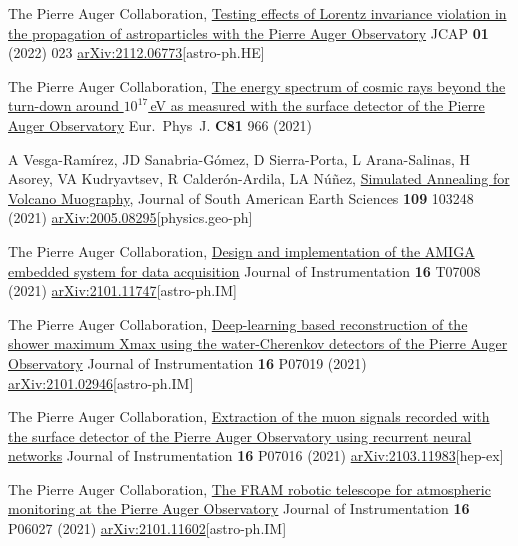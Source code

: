 \begin{etaremune}
\item {}The Pierre Auger Collaboration, \href{https://doi.org/10.1088/1475-7516/2022/01/023}{Testing effects of Lorentz invariance violation in the propagation of astroparticles with the Pierre Auger Observatory} JCAP {\textbf{01}} (2022) 023 \href{https://arxiv.org/abs/2112.06773}{arXiv:2112.06773}[astro-ph.HE]


\item {}The Pierre Auger Collaboration, \href{https://doi.org/10.1140/epjc/s10052-021-09700-w}{The energy spectrum of cosmic rays beyond the turn-down around $10^{17}$\,eV as measured with the surface detector of the Pierre Auger Observatory} Eur.\ Phys\  J. {\textbf{C81}} 966 (2021)

\item {} A Vesga-Ramírez, JD Sanabria-Gómez, D Sierra-Porta, L Arana-Salinas, H Asorey, VA Kudryavtsev, R Calderón-Ardila, LA Núñez, \href{https://doi.org/10.1016/j.jsames.2021.103248}{Simulated Annealing for Volcano Muography}, Journal of South American Earth Sciences {\textbf{109}} 103248 (2021) \href{https://arxiv.org/abs/2005.08295}{arXiv:2005.08295}[physics.geo-ph]

\item {}The Pierre Auger Collaboration, \href{https://doi.org/10.1088/1748-0221/16/07/T07008}{Design and implementation of the AMIGA embedded system for data acquisition} Journal of Instrumentation {\textbf{16}} T07008 (2021) \href{https://arxiv.org/abs/2101.11747}{arXiv:2101.11747}[astro-ph.IM]

\item {}The Pierre Auger Collaboration, \href{https://doi.org/10.1088/1748-0221/16/07/P07019}{Deep-learning based reconstruction of the shower maximum Xmax using the water-Cherenkov detectors of the Pierre Auger Observatory} Journal of Instrumentation {\textbf{16}} P07019 (2021) \href{https://arxiv.org/abs/2101.02946}{arXiv:2101.02946}[astro-ph.IM]

\item {}The Pierre Auger Collaboration, \href{https://doi.org/10.1088/1748-0221/16/07/P07016}{Extraction of the muon signals recorded with the surface detector of the Pierre Auger Observatory using recurrent neural networks} Journal of Instrumentation {\textbf{16}} P07016 (2021) \href{https://arxiv.org/abs/2103.11983}{arXiv:2103.11983}[hep-ex]

\item {}The Pierre Auger Collaboration, \href{https://doi.org/10.1088/1748-0221/16/06/P06027}{The FRAM robotic telescope for atmospheric monitoring at the Pierre Auger Observatory} Journal of Instrumentation {\textbf{16}} P06027 (2021) \href{https://arxiv.org/abs/2101.11602}{arXiv:2101.11602}[astro-ph.IM]


\end{etaremune}
